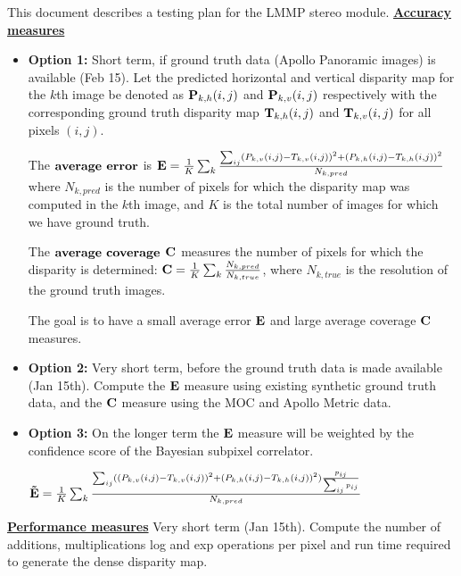 \documentclass[12pt]{article}
\begin{document}
\maketitle

This document describes a testing plan for the LMMP stereo module.
{\underline {\bf Accuracy measures}}

\begin{itemize}
\item {\bf Option 1:} Short term, if ground truth data (Apollo Panoramic images) is available (Feb 15). Let the predicted horizontal and vertical
      disparity map for the $k$th image be denoted as ${\bf P}_{k, h}(i,j)$ and ${\bf P}_{k, v}(i,j)$  respectively with the corresponding ground truth disparity map ${\bf T}_{k, h}(i,j)$ and ${\bf T}_{k, v}(i,j)$ for all pixels $(i,j)$. 

The ${\bf average}$ ${\bf error}$ is 
      ${\bf E} =\frac{1}{K}\sum_k\frac{\sum_{ij} (P_{k,v}(i,j)-T_{k,v}(i,j))^2 + (P_{k,h}(i,j)-T_{k,h}(i,j))^2}{N_{k,pred}} $ where $N_{k,pred}$ 
      is the number of pixels for which the disparity map was computed in the $k$th image, and $K$ is the total number of images for 
      which we have ground truth. 

      The ${\bf average}$ ${\bf coverage}$ ${\bf C}$ measures the number of pixels for which the disparity is determined: 
${\bf C} = \frac{1}{K}\sum_k\frac{N_{k,pred}}{N_{k,true}}$, where $N_{k, true}$ is the resolution of the ground truth images.
  
     The goal is to have a small average error ${\bf E}$ and large average coverage ${\bf C}$ measures.

\item {\bf Option 2:} Very short term, before the ground truth data is made available (Jan 15th).
                    Compute the ${\bf E}$ measure using existing synthetic ground truth data, and the ${\bf C}$ 
                    measure using the MOC and Apollo Metric data.

\item {\bf Option 3:} On the longer term the ${\bf E}$ measure will be weighted by the confidence score of the Bayesian subpixel correlator.

 
       ${\bf \tilde E} =\frac{1}{K}\sum_k\frac{\sum_{ij} ((P_{k,v}(i,j)-T_{k,v}(i,j))^2 + (P_{k,h}(i,j)-T_{k,h}(i,j))^2)\frac{p_{ij}}{\sum_{ij}p_{ij}}}{N_{k,pred}} $      
\end{itemize}

{\underline {\bf Performance measures}}
 Very short term (Jan 15th). Compute the number of additions, multiplications log and exp operations per pixel and run time required to generate the dense disparity map.
\end{document}
